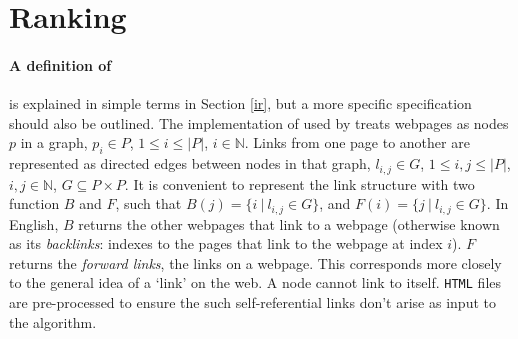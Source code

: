 \section{Ranking\label{rank}}
\paragraph{A definition of \pr{}}
\pr{} \cite{page1999} is explained in simple terms in Section
\ref{ir}, but a more specific specification should also be outlined.
The implementation of \pr{} used by \nr{} treats webpages as nodes $p$ in
a graph, $p_i \in P$, $1 \le i \le |P|$, $i \in \mathbb{N}$.  Links from one page to another
are represented as directed edges between nodes in that graph,
$l_{i,j} \in G$, $1 \le i, j \le |P|$, $i, j \in \mathbb{N}$, $G \subseteq P \times P$.  
It is convenient to represent the link structure with two function $B$
and $F$, such that $B(j) = \{i~|~l_{i, j} \in G\}$, and
$F(i) = \{j~|~l_{i, j} \in G\}$.
In English, $B$ returns
the other webpages that link to a webpage (otherwise known as its
{\it backlinks}: indexes to the pages that
link to the webpage at index $i$).  $F$ returns the {\it forward links},
the links on a webpage.  This corresponds more closely to the general
idea of a `link' on the web.  A node cannot link to itself.  {\tt HTML}
files are pre-processed to ensure the such self-referential links don't
arise as input to the algorithm.

